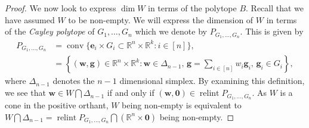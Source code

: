\documentclass[10pt]{article}
\theoremstyle{definition}
\theoremstyle{remark}
\newcommand{\R}{\mathbb{R}}
\DeclareMathOperator{\conv}{conv}
\DeclareMathOperator{\relint}{relint}
\renewcommand{\vec}[1]{\mathbf{#1}}
\begin{document}
\begin{proof}
		We now look to express $\dim W$ in terms of the polytope $B$. Recall that we have assumed $W$ to be non-empty. We will express the dimension of $W$ in terms of the \emph{Cayley polytope} of $G_1, \dots, G_n$ which we denote by $P_{G_1, \dots, G_n}$. This is given by
		\begin{align*}
			P_{G_1,\dots,G_n} &= \conv \{ \vec e_i \times G_i \subset \R^n \times \R^k : i \in [n] \}, \\
			&= \left \{ (\vec w, \vec g) \in \R^n \times \R^k: \vec w \in \Delta_{n-1}, \, \vec g = \textstyle \sum_{i \in [n]} w_i \vec g_i, \, \vec g_i \in G_i \right \},
		\end{align*}
		where $\Delta_{n-1}$ denotes the $n-1$ dimensional simplex. By examining this definition, we see that $\vec w \in W \bigcap \Delta_{n-1}$ if and only if $(\vec w, \vec 0) \in \relint P_{G_1, \dots, G_n}$. As $W$ is a cone in the positive orthant, $W$ being non-empty is equivalent to $W \bigcap \Delta_{n-1} = \relint P_{G_1, \dots, G_n} \bigcap (\R^n \times \vec 0)$ being non-empty.
		

\end{proof}
\end{document}
